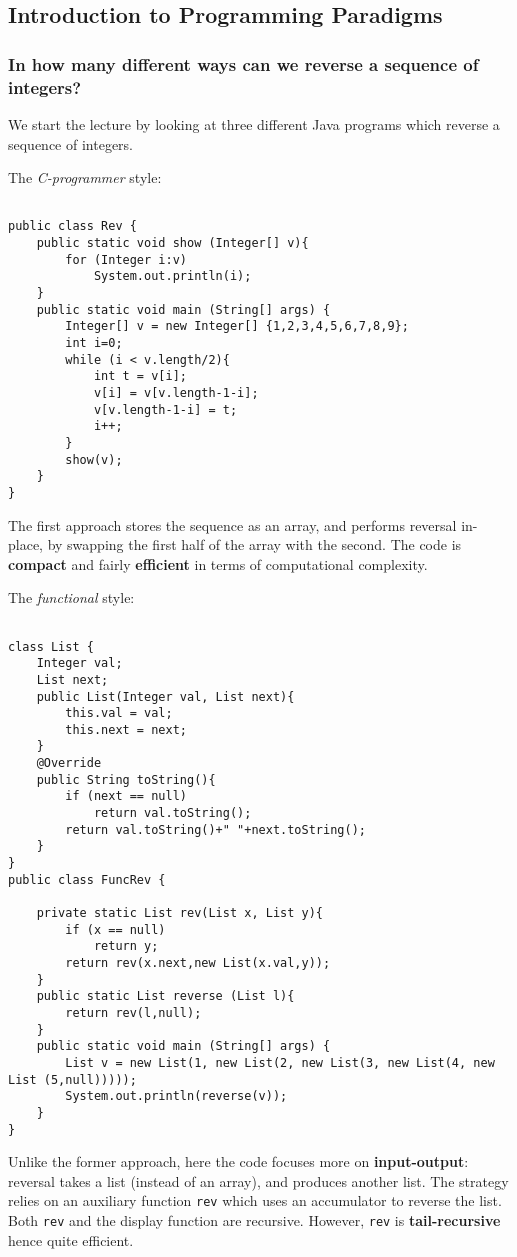 \documentclass[a4paper, 12pt]{article}
\begin{document}
\subsection{ Introduction to Programming Paradigms }

\subsubsection{ In how many different ways can we reverse a sequence of integers? }

We start the lecture by looking at three different Java programs which reverse a sequence of integers.

The \textit{C-programmer} style:

\begin{verbatim}

public class Rev {
	public static void show (Integer[] v){
		for (Integer i:v)
			System.out.println(i);
	}
	public static void main (String[] args) {
		Integer[] v = new Integer[] {1,2,3,4,5,6,7,8,9};
		int i=0;
		while (i < v.length/2){
			int t = v[i];
			v[i] = v[v.length-1-i];
			v[v.length-1-i] = t;
			i++;
		} 
		show(v);
	}
}

\end{verbatim}


The first approach stores the sequence as an array, and performs reversal in-place, by swapping the first half of the array with the second. The code is \textbf{compact} and fairly \textbf{efficient} in terms of computational complexity. 

The \textit{functional} style:

\begin{verbatim}

class List {
	Integer val;
	List next;
	public List(Integer val, List next){
		this.val = val;
		this.next = next;
	}
	@Override
	public String toString(){
		if (next == null)
			return val.toString();
		return val.toString()+" "+next.toString();
	}
}
public class FuncRev {

	private static List rev(List x, List y){
		if (x == null)
			return y;
		return rev(x.next,new List(x.val,y));
	}
	public static List reverse (List l){
		return rev(l,null);
	}
	public static void main (String[] args) {
		List v = new List(1, new List(2, new List(3, new List(4, new List (5,null)))));
		System.out.println(reverse(v));
	}
}

\end{verbatim}


Unlike the former approach, here the code focuses more on \textbf{input-output}: reversal takes a list (instead of an array), and produces another list. The strategy relies on an auxiliary function \texttt{rev} which uses an accumulator to reverse the list. Both \texttt{rev} and the display function are recursive. However, \texttt{rev} is \textbf{tail-recursive} hence quite efficient.
\end{document}
